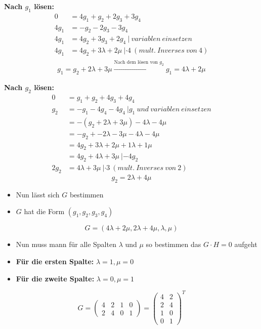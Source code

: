 \textbf{Nach $g_1$ lösen:}
\begin{align*}
0 &= 4g_1 + g_2 + 2g_3 + 3g_4\\
4g_1 &= -g_2 -2g_3 -3g_4\\
4g_1 &= 4g_2 + 3g_3 + 2g_4 \ | \ variablen \ einsetzen\\
4g_1 &= 4g_2 + 3\lambda + 2\mu \ | \cdot 4 \ (mult. \ Inverses \ von \ 4)\\
\end{align*}
$$
\boxed{g_1 = g_2 + 2\lambda + 3\mu} \xrightarrow[]{\text{Nach dem lösen von } g_2} \boxed{g_1 = 4\lambda + 2\mu}
$$

\textbf{Nach $g_2$ lösen:}
\begin{align*}
0 &= g_1 + g_2 + 4g_3 + 4g_4\\
g_2 &= -g_1 - 4g_4 - 4g_4 \ | g_1 \ und \ variablen \ einsetzen\\
&= -(g_2 + 2\lambda + 3\mu) - 4\lambda - 4\mu\\
&= -g_2 + -2\lambda -3\mu - 4\lambda - 4\mu\\
&= 4g_2 + 3 \lambda + 2\mu + 1 \lambda + 1\mu\\
&= 4g_2 + 4 \lambda + 3 \mu \ | -4g_2\\
2g_2 &= 4 \lambda + 3 \mu \ | \cdot 3 \ (mult. \ Inverses \ von \ 2)
\end{align*}
$$
\boxed{g_2 = 2\lambda + 4\mu}
$$

\begin{itemize}
\item Nun lässt sich $G$ bestimmen
\item $G$ hat die Form $(g_1, g_2, g_3, g_4)$
\end{itemize}
$$
G = (4\lambda + 2\mu, 2\lambda + 4\mu, \lambda, \mu)
$$

\begin{itemize}
\item Nun muss mann für alle Spalten $\lambda$ und $\mu$ so bestimmen das $G\cdot H = 0$ aufgeht
\item \textbf{Für die ersten Spalte:} $\lambda = 1, \mu = 0$
\item \textbf{Für die zweite Spalte:} $\lambda = 0, \mu = 1$
\end{itemize}
$$
G = \begin{pmatrix}
4 & 2 & 1 & 0\\
2 & 4 & 0 & 1
\end{pmatrix} = \begin{pmatrix}
4 & 2\\
2 & 4\\
1 & 0\\
0 & 1
\end{pmatrix}^T
$$

